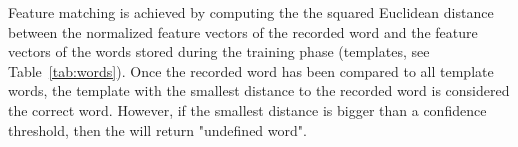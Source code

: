 %
Feature matching is achieved by computing the the squared Euclidean distance between the normalized feature vectors of the recorded word and the feature vectors of the words stored during the training phase (templates, see Table~\ref{tab:words}). 
Once the recorded word has been compared to all template words, the template with the smallest distance to the recorded word is considered the correct word. However, if the smallest distance is bigger than a confidence threshold, then the \cim will return "undefined word". 



